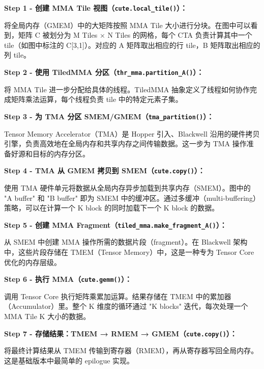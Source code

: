 \textbf{Step 1 - 创建 MMA Tile 视图（\texttt{cute.\allowbreak{}local\_\allowbreak{}tile()}）：}

将全局内存（GMEM）中的大矩阵按照 MMA Tile 大小进行分块。在图中可以看到，矩阵 C 被划分为 M Tiles × N Tiles 的网格，每个 CTA 负责计算其中一个 tile（如图中标注的 C[3,1]）。对应的 A 矩阵取出相应的行 tile，B 矩阵取出相应的列 tile。

\textbf{Step 2 - 使用 Tiled\allowbreak{}MMA 分区（\texttt{thr\_\allowbreak{}mma.\allowbreak{}partition\_\allowbreak{}A()}）：}

将 MMA Tile 进一步分配给具体的线程。Tiled\allowbreak{}MMA 抽象定义了线程如何协作完成矩阵乘法运算，每个线程负责 tile 中的特定元素子集。

\textbf{Step 3 - 为 TMA 分区 SMEM/\allowbreak{}GMEM（\texttt{tma\_\allowbreak{}partition()}）：}

Tensor Memory Accelerator（TMA）是 Hopper 引入、Blackwell 沿用的硬件拷贝引擎，负责高效地在全局内存和共享内存之间传输数据。这一步为 TMA 操作准备好源和目标的内存分区。

\textbf{Step 4 - TMA 从 GMEM 拷贝到 SMEM（\texttt{cute.\allowbreak{}copy()}）：}

使用 TMA 硬件单元将数据从全局内存异步加载到共享内存（SMEM）。图中的 "A buffer" 和 "B buffer" 即为 SMEM 中的缓冲区。通过多缓冲（multi-buffering）策略，可以在计算一个 K block 的同时加载下一个 K block 的数据。

\textbf{Step 5 - 创建 MMA Fragment（\texttt{t\allowbreak{}i\allowbreak{}l\allowbreak{}e\allowbreak{}d\allowbreak{}\_\allowbreak{}m\allowbreak{}m\allowbreak{}a\allowbreak{}.\allowbreak{}m\allowbreak{}a\allowbreak{}k\allowbreak{}e\allowbreak{}\_\allowbreak{}f\allowbreak{}r\allowbreak{}a\allowbreak{}g\allowbreak{}m\allowbreak{}e\allowbreak{}n\allowbreak{}t\allowbreak{}\_\allowbreak{}A\allowbreak{}(\allowbreak{})}）：}

从 SMEM 中创建 MMA 操作所需的数据片段（fragment）。在 Blackwell 架构中，这些片段存储在 TMEM（Tensor Memory）中，这是一种专为 Tensor Core 优化的内存层级。

\textbf{Step 6 - 执行 MMA（\texttt{cute.\allowbreak{}gemm()}）：}

调用 Tensor Core 执行矩阵乘累加运算。结果存储在 TMEM 中的累加器（Accumulator）里。整个 K 维度的循环通过 "K blocks" 迭代，每次处理一个 MMA Tile K 大小的数据。

\textbf{Step 7 - 存储结果：TMEM → RMEM → GMEM（\texttt{cute.\allowbreak{}copy()}）：}

将最终计算结果从 TMEM 传输到寄存器（RMEM），再从寄存器写回全局内存。这是基础版本中最简单的 epilogue 实现。

